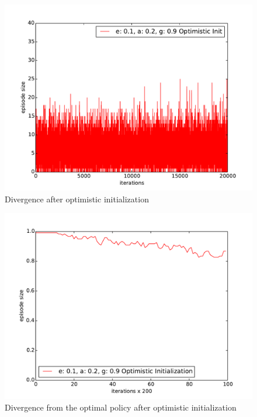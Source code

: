 \documentclass[paper=a4, fontsize=11pt]{scrartcl}
\numberwithin{equation}{section}		%
\numberwithin{figure}{section}			%
\numberwithin{table}{section}				%
\begin{document}
\begin{figure}[H] \centering
\includegraphics[scale=0.6]{convergenceQLearningOptimistic.pdf}
\caption{Divergence after optimistic initialization} 
\label{figure:DivOpti}
\end{figure}

\begin{figure}[H] \centering
\includegraphics[scale=0.6]{optimalityOptimistic.pdf}
\caption{Divergence from the optimal policy after optimistic initialization} 
\label{figure:OptiDiv}
\end{figure}
\end{document}
